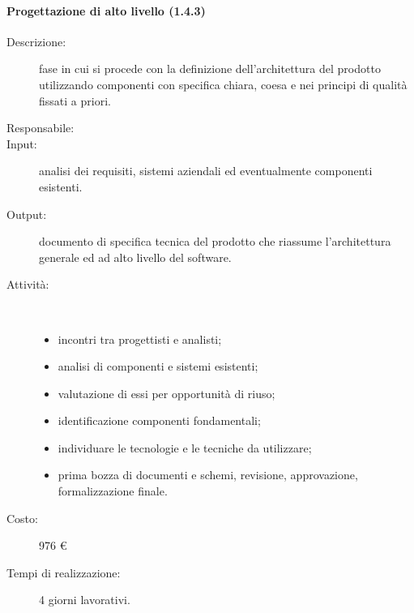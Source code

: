 \paragraph{Progettazione di alto livello (1.4.3)}
\begin{description}
\item[Descrizione:] fase in cui si procede con la definizione dell'architettura del prodotto utilizzando componenti con
specifica chiara, coesa e nei principi di qualit\`{a} fissati a priori.
\item[Responsabile:] 
\item[Input:] analisi dei requisiti, sistemi aziendali ed eventualmente componenti esistenti.
\item[Output:] documento di specifica tecnica del prodotto che riassume l'architettura generale ed ad
alto livello del software.
\item[Attività:]\mbox{}\\[-1.5\baselineskip]
	\begin{itemize}
	\item incontri tra progettisti e analisti;
	\item analisi di componenti e sistemi esistenti;
	\item valutazione di essi per opportunità di riuso;
	\item identificazione componenti fondamentali;
	\item individuare le tecnologie e le tecniche da utilizzare;
	\item prima bozza di documenti e schemi, revisione, approvazione, formalizzazione finale.
	\end{itemize}
\item[Costo:] 976 \euro{}
\item[Tempi di realizzazione:] 4 giorni lavorativi.
\end{description}

